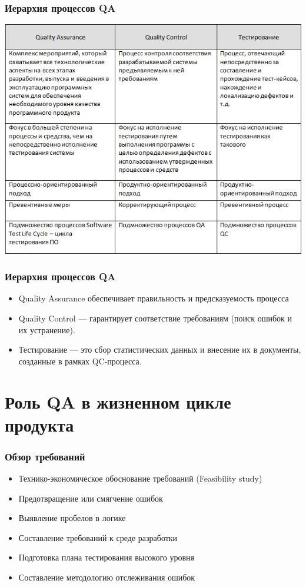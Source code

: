 \documentclass{../industrial-development}
\begin{document}
	\begin{frame} \frametitle{Иерархия процессов QA}
		\centerline{\includegraphics[height=0.7\textheight]{QA_QC.png}}
	\end{frame}
	
	\begin{frame} \frametitle{Иерархия процессов QA}
		\begin{itemize}
			\item Quality Assurance обеспечивает правильность и предсказуемость процесса 
			
			\item Quality Control --- гарантирует соответствие требованиям (поиск ошибок и их устранение).
			
			\item Тестирование --- это сбор статистических данных и внесение их в документы, созданные в рамках QC-процесса.
		\end{itemize}
	\end{frame}
	
		
	\section{Роль QA в жизненном цикле продукта}
	\begin{frame} \frametitle{Обзор требований}
		\begin{itemize}
			\item Технико-экономическое обоснование требований (Feasibility study)
			\item Предотвращение или смягчение ошибок
			\item Выявление пробелов в логике
			\item Составление требований к среде разработки
			\item Подготовка плана тестирования высокого уровня
			\item Составление методологию отслеживания ошибок
		\end{itemize}
	\end{frame}
	
\end{document}
